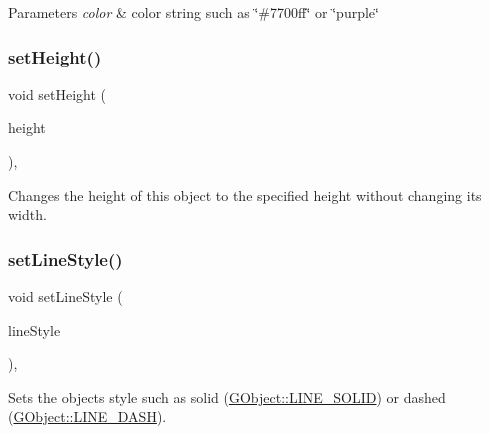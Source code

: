 \begin{DoxyParams}{Parameters}
{\em color} & color string such as \char`\"{}\#7700ff\char`\"{} or \char`\"{}purple\char`\"{} \\
\hline
\end{DoxyParams}
\mbox{\label{classsgl_1_1GObject_a9e280bfc4544dfaf8e4376c4e1a74357}} 
\subsubsection{\texorpdfstring{set\+Height()}{setHeight()}}
{\footnotesize\ttfamily void set\+Height (\begin{DoxyParamCaption}\item[{double}]{height }\end{DoxyParamCaption})\hspace{0.3cm}{\ttfamily [virtual]}, {\ttfamily [inherited]}}



Changes the height of this object to the specified height without changing its width. 

\mbox{\label{classsgl_1_1GObject_add11575087eb94f1a71faa3f826c6341}} 
\subsubsection{\texorpdfstring{set\+Line\+Style()}{setLineStyle()}}
{\footnotesize\ttfamily void set\+Line\+Style (\begin{DoxyParamCaption}\item[{\mbox{\hyperlink{classsgl_1_1GObject_a86e0f5648542856159bb40775c854aa7}{G\+Object\+::\+Line\+Style}}}]{line\+Style }\end{DoxyParamCaption})\hspace{0.3cm}{\ttfamily [virtual]}, {\ttfamily [inherited]}}



Sets the object\textquotesingle{}s style such as solid (\mbox{\hyperlink{classsgl_1_1GObject_a86e0f5648542856159bb40775c854aa7a700c78bc2cd76acaab26651bf7b4941f}{G\+Object\+::\+L\+I\+N\+E\+\_\+\+S\+O\+L\+ID}}) or dashed (\mbox{\hyperlink{classsgl_1_1GObject_a86e0f5648542856159bb40775c854aa7a9ccba0845f785d81d07b333ae1aad84e}{G\+Object\+::\+L\+I\+N\+E\+\_\+\+D\+A\+SH}}). 

